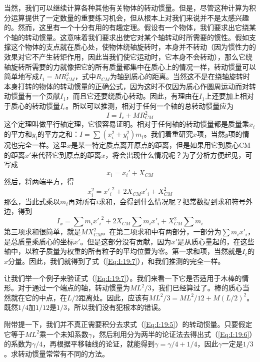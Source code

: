 当然，我们可以继续计算各种其他有关物体的转动惯量。但是，尽管这种计算为积分运算提供了一定数量的重要练习机会，但从根本上对我们来说并不是太感兴趣的。然而，这里有一个十分有用的有趣定理。假设有一个物体，我们要求出它绕某个轴的转动惯量。这意味着我们要求出使它对某个轴转动时所需要的惯性。假如支撑这个物体的支点就在质心处，使物体绕轴旋转时，本身并不转动（因为惯性力的效果对它不产生转矩作用，因此当我们使它运动时，它本身不会转动），那么它绕轴旋转所需要的力就像把它的所有质量都集中在质心上的情况一样，转动惯量可以简单地写成$I_1=MR^2_{CM}$，式中$R_{CM}$为轴到质心的距离。当然这不是在绕轴旋转时本身打转的物体的转动惯量的正确公式，因为这时不仅因为质心作圆周运动而对转动惯量有一个贡献$I_1$，而且它还要绕质心转动。因此，有理由在$I_1$上还要加上相对于质心的转动惯量$I_c$。所以可以推测，相对于任何一个轴的总转动惯量应为
\begin{equation}
    \label{Eq:I:19:7}
    I=I_c + MR_{CM}^2
\end{equation}
这个定理叫做平行轴定理，它很容易证明。相对于任何轴的转动惯量都是质量乘$x_i$的平方和$y_i$的平方之和：$I=\sum (x_i^2 + y_i^2)m_i$。我们着重研究$x$项，当然$y$项的情况也完全一样。这里$x$是某一特定质点离开原点的距离，但是如果用它到质心CM的距离$x'$来代替它到原点的距离$x$，将会出现什么情况呢？为了分析方便起见，可写成
\begin{equation*}
    x_i=x_i' + X_{CM}
\end{equation*}
然后，将两端平方，得
\begin{equation*}
    x_i^2={x'_i}^2 + 2X_{CM}x'_i + X_{CM}^2
\end{equation*}
那么，当此式乘以$m_i$再对所有$i$求和，会得到什么情况呢？把常数提到求和符号外边，得到
\begin{equation*}
    I_x = \sum m_i {x'_i}^2 + 2X_{CM} \sum m_i x'_i + X^2_{CM} \sum m_i
\end{equation*}
第三项求和很简单，就是$MX_{CM}^2$。在第二项求和中有两部分，一部分为$\sum m_ix'_i$，是总质量乘质心的坐标$x'$。但是这部分没有贡献，因为$x'$是从质心量起的，在这些轴中，以粒子质量为权重的所有粒子的平均位置为零。第一求和项，当然就是$I_c$的$x$分量。因此，我们就得到了式（\ref{Eq:I:19:7}），和我们推测的完全一样。

让我们举一个例子来验证式（\ref{Eq:I:19:7}）。我们来看一下它是否适用于木棒的情形。对于通过一个端点的轴，转动惯量为$ML^2/3$，我们已经算过了。棒的质心当然就在它的中点，在$L/2$距离处。因此，应该有$ML^2/3=ML^2/12+M(L/2)^2$。既然$1/4$加$1/12$是$1/3$，所以我们没有犯根本的错误。

附带提一下，我们并不真正需要积分去求式（\ref{Eq:I:19:5}）的转动惯量。只要假定它等于$ML^2$乘一个未知系数$\gamma$，然后利用分为两半的论证法去得出式（\ref{Eq:I:19:6}）的系数为$\gamma/4$，再根据平移轴线的论证，就能得到$\gamma = \gamma /4+1/4$，因此$\gamma$一定是$1/3$。求转动惯量常常有不同的方法。

